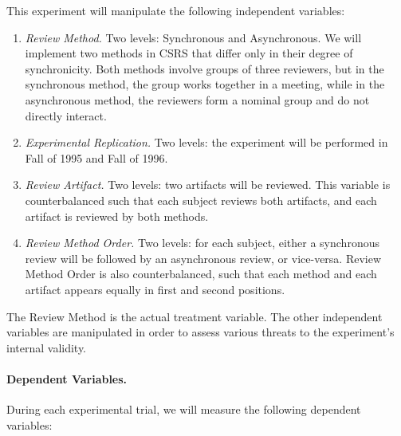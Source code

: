This experiment will manipulate the following independent variables:
\begin{enumerate}

\item {\em Review Method.} Two levels: Synchronous and Asynchronous.  We
  will implement two methods in CSRS that differ only in their degree of
  synchronicity.  Both methods involve groups of three reviewers, but in
  the synchronous method, the group works together in a meeting, while in
  the asynchronous method, the reviewers form a nominal group and do not
  directly interact.

\item {\em Experimental Replication.}  Two levels: the experiment will be
  performed in Fall of 1995 and Fall of 1996.

\item {\em Review Artifact.}  Two levels: two artifacts will be reviewed.
  This variable is counterbalanced such that each subject reviews both
  artifacts, and each artifact is reviewed by both methods.

\item {\em Review Method Order.} Two levels: for each subject, either a
  synchronous review will be followed by an asynchronous review, or
  vice-versa. Review Method Order is also counterbalanced, such that each
  method and each artifact appears equally in first and second positions.

\end{enumerate}

The Review Method is the actual treatment variable.  The other independent
variables are manipulated in order to assess various threats to the
experiment's internal validity.

\paragraph {Dependent Variables.}

During each experimental trial, we will measure the following dependent
variables:

